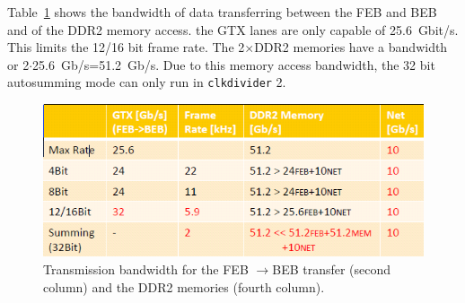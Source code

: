 \documentclass{article}
\begin{document}
Table~\ref{tx} shows the bandwidth of data transferring between the FEB and BEB and of the DDR2 memory access. the GTX lanes are only capable of 25.6~Gbit/s. This limits the 12/16 bit frame rate. The 2$\times$DDR2 memories have a bandwidth or 2$\cdot$25.6~Gb/s=51.2~Gb/s. Due to this memory access bandwidth, the 32 bit autosumming mode can only run in {\tt{clkdivider}} 2.   
\begin{figure}[t]
\begin{center}
\includegraphics[width=1.\textwidth]{TansmissionRates}
\end{center}
\caption{Transmission bandwidth for the FEB $\to$BEB transfer (second column) and the DDR2 memories (fourth column). }
\label{tx}
\end{figure}
\end{document}
